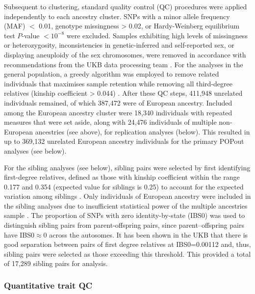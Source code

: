 \documentclass[12pt]{zHenriquesLab-StyleBioRxiv}
\begin{document}
{{Subsequent to clustering, standard quality control (QC) procedures
were applied independently to each ancestry cluster. SNPs with a minor
allele frequency (MAF) $<$ 0.01, genotype missingness > 0.02, or
Hardy-Weinberg equilibrium test $P$-value $< 10^{-8}$ were
excluded. Samples exhibiting high levels of missingness or
heterozygosity, inconsistencies in genetic-inferred and self-reported
sex, or displaying aneuploidy of the sex chromosomes, were removed in
accordance with recommendations from the UKB data processing team
\cite{ukb_qc}.  For the analyses in the general population, a greedy
algorithm was employed to remove related individuals that maximises
sample retention while removing all third-degree relatives (kinship
coefficient > 0.044) \cite{erase}.  After these QC steps, 411,948 unrelated    %
individuals remained, of which 387,472 were of European ancestry. Included 
among the European ancestry cluster were 18,340 individuals with repeated 
measures that were set aside, along with 24,476 individuals of multiple 
non-European ancestries (see above), for replication analyses (below). This resulted in up to 369,132 
unrelated European ancestry individuals for the primary POPout analyses (see below). 

For the sibling analyses (see below), sibling pairs were selected by first
identifying first-degree relatives, defined as those with kinship
coefficient within the range 0.177 and 0.354 (expected value for
siblings is 0.25) to account for the expected variation among siblings \cite{sib1}. 
Only individuals of European ancestry were included in the sibling analyses due to 
insufficient statistical power of the multiple ancestries sample \cite{Souaiaia2024}. 
The proportion of SNPs with zero identity-by-state (IBS0) was used to distinguish 
sibling pairs from parent-offspring pairs, since parent–offspring pairs have
IBS0$\approx$0 across the autosomes. It has been shown in the UKB that
there is good separation between pairs of first degree relatives at
IBS0=0.00112 \cite{sib1} and, thus, sibling pairs were selected as
those exceeding this threshold. This provided a total of 17,289 sibling pairs 
for analysis.

\subsubsection*{Quantitative trait QC} \label{sec:methods:traitQC} 
}}
\end{document}
